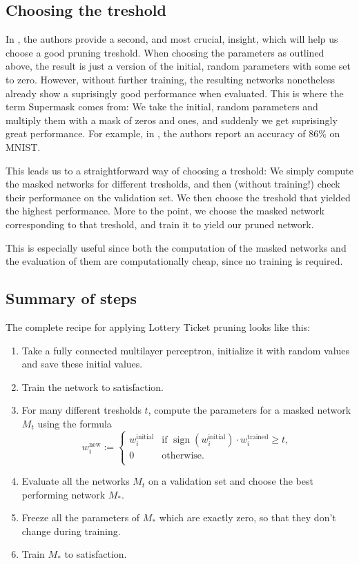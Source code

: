\documentclass[12pt,final,twoside]{article}
\theoremstyle{plain}
\theoremstyle{definition}
\theoremstyle{remark}
\theoremstyle{named}
\begin{document}
\subsection{Choosing the treshold}
In \cite{supermask}, the authors provide a second, and most crucial, insight, which will help us choose a good pruning treshold. When choosing the parameters as outlined above, the result is just a version of the initial, random parameters with some set to zero. However, without further training, the resulting networks nonetheless already show a suprisingly good performance when evaluated. This is where the term Supermask comes from: We take the initial, random parameters and multiply them with a mask of zeros and ones, and suddenly we get suprisingly great performance. For example, in \cite{supermask}, the authors report an accuracy of $86\%$ on MNIST.

This leads us to a straightforward way of choosing a treshold: We simply compute the masked networks for different tresholds, and then (without training!) check their performance on the validation set. We then choose the treshold that yielded the highest performance. More to the point, we choose the masked network corresponding to that treshold, and train it to yield our pruned network.

This is especially useful since both the computation of the masked networks and the evaluation of them are computationally cheap, since no training is required.

\subsection{Summary of steps}
The complete recipe for applying Lottery Ticket pruning looks like this:
\begin{enumerate}
\item Take a fully connected multilayer perceptron, initialize it with random values and save these initial values.
\item Train the network to satisfaction.
\item For many different tresholds $t$, compute the parameters for a masked network $M_t$ using the formula
$$
w_i^{\text{new}} := \begin{cases}
w_i^{\text{initial}} & \text{if } \operatorname{sign}\left(w_i^{\text{initial}} \right) \cdot w_i^{\text{trained}} \geq t, \\ 
0 & \text{otherwise.} \\
\end{cases}
$$
\item Evaluate all the networks $M_t$ on a validation set and choose the best performing network $M_\ast$.
\item Freeze all the parameters of $M_\ast$ which are exactly zero, so that they don't change during training.
\item Train $M_\ast$ to satisfaction.
\end{enumerate}
\end{document}
